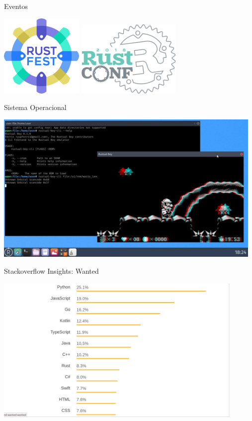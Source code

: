 \documentclass[aspectratio=169]{beamer}
\begin{document}
\begin{frame}{Eventos}
	\begin{center}
		\includegraphics[width=4.0cm]{imgs/rustfest.png}
		\hspace{1cm}	
		\includegraphics[width=5.0cm]{imgs/rustconf.png}	
	\end{center}
\end{frame}

\begin{frame}{Sistema Operacional}
	\begin{center}
	\includegraphics[width=13.0cm]{imgs/redox.jpg}	
	\end{center}
\end{frame}

\begin{frame}{Stackoverflow Insights: Wanted}
	\begin{center}
		\includegraphics[width=12.0cm]{imgs/stackoverflow-wanted.png}	
	\end{center}
\end{frame}
\end{document}
